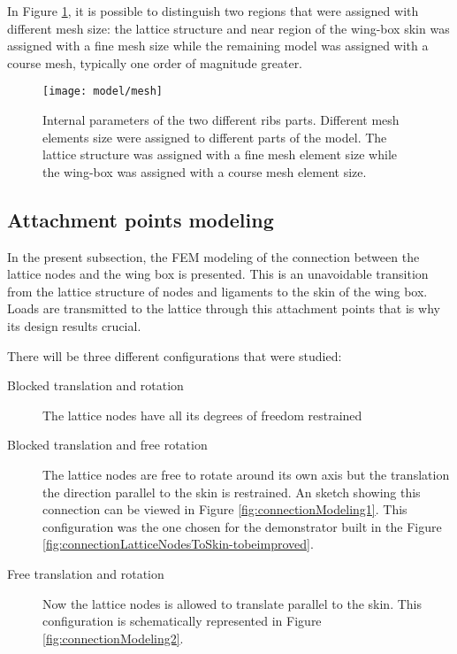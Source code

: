 In Figure \ref{fig:mesh}, it is possible to distinguish two regions that were assigned with different mesh size: the lattice structure and near region of the wing-box skin was assigned with a fine mesh size while the remaining model was assigned with a course mesh, typically one order of magnitude greater.

\begin{figure}[!htpb]
  \centering
  \texttt{[image: model/mesh]}
  \caption[Internal parameters of the two different ribs parts]{Internal parameters of the two different ribs parts. Different mesh elements size were assigned to different parts of the model. The lattice structure was assigned with a fine mesh element size while the wing-box was assigned with a course mesh element size.}\label{fig:mesh}
\end{figure}

\clearpage
\subsection{Attachment points modeling} \label{subsec:connections_computationalModel}

%
%
%
%
In the present subsection, the FEM modeling of the connection between the lattice nodes and the wing box is presented. This is an unavoidable transition from the lattice structure of nodes and ligaments to the skin of the wing box. Loads are transmitted to the lattice through this attachment points that is why its design results crucial.

There will be three different configurations that were studied:

\begin{description}
  \item[Blocked translation and rotation] The lattice nodes have all its degrees of freedom restrained
  \item[Blocked translation and free rotation] The lattice nodes are free to rotate around its own axis but the translation the direction parallel to the skin is restrained. An sketch showing this connection can be viewed in Figure \ref{fig:connectionModeling1}. This configuration was the one chosen for the demonstrator built in the Figure \ref{fig:connectionLatticeNodesToSkin-tobeimproved}.
  \item[Free translation and rotation] Now the lattice nodes is allowed to translate parallel to the skin. This configuration is schematically represented in Figure \ref{fig:connectionModeling2}.
\end{description}

